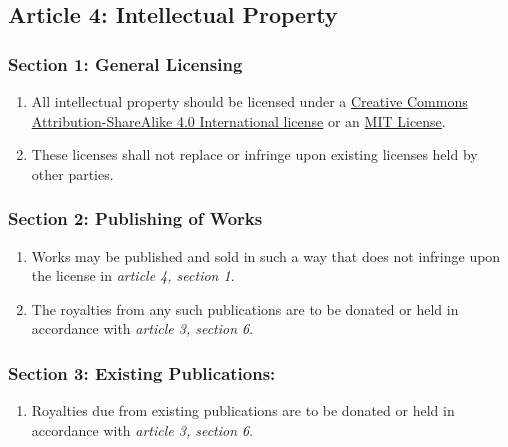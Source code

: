 \hypertarget{article-4-intellectual-property}{%
\subsection*{Article 4: Intellectual Property}\label{article-4-intellectual-property}}

\hypertarget{section-1-general-licensing}{%
\subsubsection*{Section 1: General Licensing}\label{section-1-general-licensing}}

\begin{enumerate}
\def\labelenumi{\arabic{enumi}.}
\tightlist
\item
  All intellectual property should be licensed under a \href{https://creativecommons.org/licenses/by-sa/4.0/}{Creative Commons Attribution-ShareAlike 4.0 International license} or an \href{https://opensource.org/licenses/MIT}{MIT License}.
\item
  These licenses shall not replace or infringe upon existing licenses held by other parties.
\end{enumerate}

\hypertarget{section-2-publishing-of-works}{%
\subsubsection*{Section 2: Publishing of Works}\label{section-2-publishing-of-works}}

\begin{enumerate}
\def\labelenumi{\arabic{enumi}.}
\tightlist
\item
  Works may be published and sold in such a way that does not infringe upon the license in \emph{article 4, section 1}.
\item
  The royalties from any such publications are to be donated or held in accordance with \emph{article 3, section 6}.
\end{enumerate}

\hypertarget{section-3-existing-publications}{%
\subsubsection*{Section 3: Existing Publications:}\label{section-3-existing-publications}}

\begin{enumerate}
\def\labelenumi{\arabic{enumi}.}
\tightlist
\item
  Royalties due from existing publications are to be donated or held in accordance with \emph{article 3, section 6}.
\end{enumerate}

